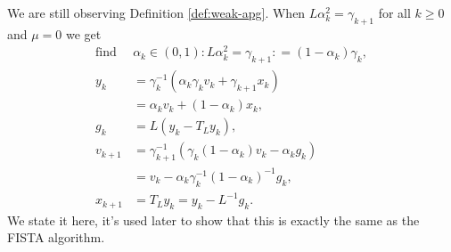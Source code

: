 \documentclass[12pt]{article}
\begin{document}
    \begin{observation}\label{obs:weak-apg-observation-2}
        We are still observing Definition \ref*{def:weak-apg}. 
        When $L\alpha_k^2 = \gamma_{k + 1}$ for all $k\ge 0$ and $\mu = 0$ we get 
        \begin{align*}
            \text{find } &
            \alpha_k \in(0, 1): L\alpha_k^2 =\gamma_{k + 1}: = (1 - \alpha_k)\gamma_k, 
            \\
            y_k &= 
            \gamma_k^{-1}(\alpha_k \gamma_k v_k + \gamma_{k + 1}x_k)
            \\
            &= \alpha_k v_k + (1 - \alpha_k) x_k,
            \\
            g_k &= L (y_k - T_L y_k), 
            \\
            v_{k + 1} &= \gamma_{k + 1}^{-1}
            (\gamma_k(1 - \alpha_k) v_k - \alpha_k g_k)
            \\
            &= v_k - \alpha_k \gamma_k^{-1}(1 - \alpha_k)^{-1}g_k, 
            \\
            x_{k + 1} &= T_L y_k = y_k - L^{-1} g_k. 
        \end{align*}
        We state it here, it's used later to show that this is exactly the same as the FISTA algorithm. 

    \end{observation}
\end{document}
